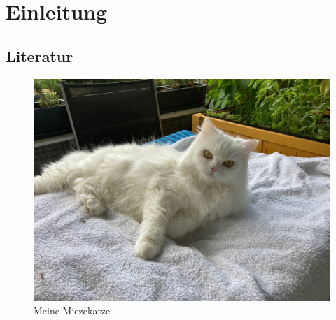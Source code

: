 \chapter{Einleitung}
\section{Literatur}

\blindtext{}

\blindtext[20]


\begin{figure}
\includegraphics[width=\textwidth]{Bilder/Katze1}
\caption{Meine Miezekatze}\label{fig:katze1}
\end{figure}

